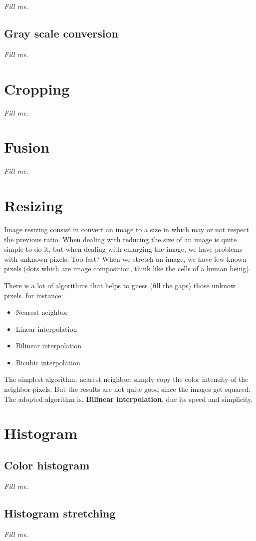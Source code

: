 \documentclass{report}
\begin{document}
		\textit{Fill me}.

	\subsection{Gray scale conversion}

		\textit{Fill me}.

\section{Cropping}

	\textit{Fill me}.

\section{Fusion}

	\textit{Fill me}.

\section{Resizing}

	Image resizing consist in convert an image to a size in which may or not respect the previous ratio.
	When dealing with reducing the size of an image is quite simple to do it, but when dealing with enlarging 
	the image, we have problems with unknown pixels. Too fast?
	When we stretch an image, we have few known pixels (dots which are image composition, think like the cells of a human being).

	There is a lot of algorithms that helps to guess (fill the gaps) those unknow pixels. for instance:

	\begin{itemize}
	  \item Nearest neighbor
	  \item Linear interpolation
	  \item Bilinear interpolation
	  \item Bicubic interpolation
	\end{itemize}

	The simplest algorithm, nearest neighbor, simply copy the color intensity of the neighbor pixels. But the results are not quite good since 
	the images get squared.
	The adopted algorithm is, \textbf{Bilinear interpolation},  due its speed and simplicity.

\section{Histogram}

	\subsection{Color histogram}

		\textit{Fill me}.

	\subsection{Histogram stretching}

		\textit{Fill me}.
\end{document}

